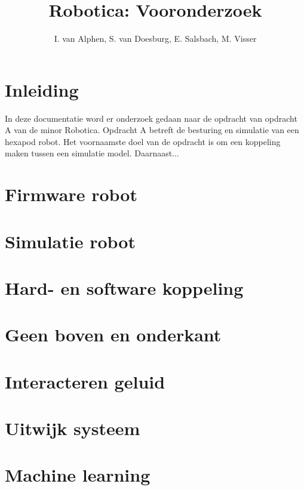 \documentclass[10pt,a4paper]{article}
\title{Robotica: Vooronderzoek}
\author{I. van Alphen, S. van Doesburg, E.  Salsbach, M. Visser}
\begin{document}
\maketitle

\section{Inleiding}
In deze documentatie word er onderzoek gedaan naar de opdracht van opdracht A van de minor Robotica. Opdracht A betreft de besturing en simulatie van een hexapod robot. Het voornaamste doel van de opdracht is om een koppeling maken tussen een simulatie model. Daarnaast...

\section{Firmware robot}

\section{Simulatie robot}

\section{Hard- en software koppeling}

\section{Geen boven en onderkant}

\section{Interacteren geluid}

\section{Uitwijk systeem}

\section{Machine learning}
\end{document}
